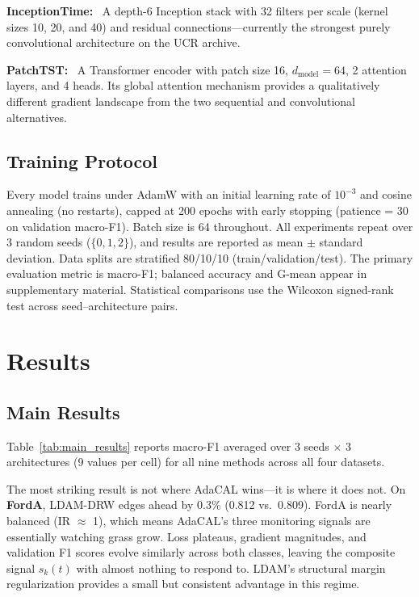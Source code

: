 \documentclass[letterpaper]{article}
\begin{document}
\textbf{InceptionTime:}~\citep{fawaz2020inceptiontime} A depth-6 Inception stack with 32 filters per scale (kernel sizes 10, 20, and 40) and residual connections---currently the strongest purely convolutional architecture on the UCR archive.

\textbf{PatchTST:}~\citep{nie2023patchtst} A Transformer encoder with patch size 16, $d_\text{model}=64$, 2 attention layers, and 4 heads. Its global attention mechanism provides a qualitatively different gradient landscape from the two sequential and convolutional alternatives.

\subsection{Training Protocol}

Every model trains under AdamW with an initial learning rate of $10^{-3}$ and cosine annealing (no restarts), capped at 200 epochs with early stopping (patience = 30 on validation macro-F1). Batch size is 64 throughout. All experiments repeat over 3 random seeds ($\{0, 1, 2\}$), and results are reported as mean $\pm$ standard deviation. Data splits are stratified 80/10/10 (train/validation/test). The primary evaluation metric is macro-F1; balanced accuracy and G-mean appear in supplementary material. Statistical comparisons use the Wilcoxon signed-rank test across seed--architecture pairs.

\section{Results}

\subsection{Main Results}

Table~\ref{tab:main_results} reports macro-F1 averaged over 3 seeds $\times$ 3 architectures (9 values per cell) for all nine methods across all four datasets.

The most striking result is not where AdaCAL wins---it is where it does not. On \textbf{FordA}, LDAM-DRW edges ahead by 0.3\% (0.812 vs.\ 0.809). FordA is nearly balanced (IR $\approx$ 1), which means AdaCAL's three monitoring signals are essentially watching grass grow. Loss plateaus, gradient magnitudes, and validation F1 scores evolve similarly across both classes, leaving the composite signal $s_k(t)$ with almost nothing to respond to. LDAM's structural margin regularization provides a small but consistent advantage in this regime.
\end{document}
